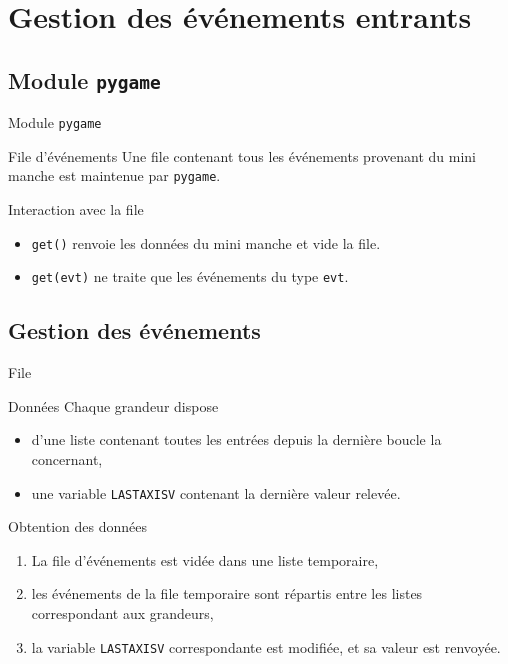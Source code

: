 \documentclass[footheight=2em]{beamer}
\begin{document}
\section{Gestion des événements entrants}
\subsection{Module \texttt{pygame}}
\begin{frame}[t]{Module \texttt{pygame}}
  \begin{block}{File d'événements}
    Une file contenant tous les événements provenant du mini manche est
    maintenue par \texttt{pygame}.
  \end{block}
  \begin{block}{Interaction avec la file}
    \pause
    \begin{itemize}
      \item \texttt{get()} renvoie les données du mini manche et vide la file.
      \item \texttt{get(evt)} ne traite que les événements du type \texttt{evt}.
    \end{itemize}
  \end{block}
\end{frame}

\subsection{Gestion des événements}
\begin{frame}[t]{File}
  \begin{block}{Données}
    Chaque grandeur dispose
    \begin{itemize}
      \item d'une liste contenant toutes les entrées depuis la dernière boucle
        la concernant,
      \item une variable \texttt{LASTAXISV} contenant la dernière
        valeur relevée.
    \end{itemize}
  \end{block}
  \begin{block}{Obtention des données}
    \begin{enumerate}
      \item La file d'événements est vidée dans une liste temporaire,
      \item les événements de la file temporaire sont répartis entre les listes
        correspondant aux grandeurs,
      \item la variable \texttt{LASTAXISV} correspondante est modifiée, et sa
        valeur est renvoyée.
    \end{enumerate}
  \end{block}
\end{frame}
\end{document}
